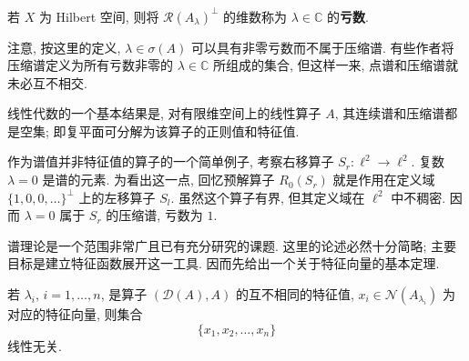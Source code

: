 \begin{Definition}
\label{def:spectral-deficiency}
若 $X$ 为 Hilbert 空间, 则将 $\mathcal{R}(A_\lambda)^\perp$ 的维数称为 $\lambda\in\mathbb{C}$ 的\textbf{亏数}.
\end{Definition}

注意, 按这里的定义, $\lambda\in\sigma(A)$ 可以具有非零亏数而不属于压缩谱. 有些作者将压缩谱定义为所有亏数非零的 $\lambda\in\mathbb{C}$ 所组成的集合, 但这样一来, 点谱和压缩谱就未必互不相交.

\begin{Example}
\label{ex:finite-dimensional-spectrum-regular-eigenvalues}
线性代数的一个基本结果是, 对有限维空间上的线性算子 $A$, 其连续谱和压缩谱都是空集; 即复平面可分解为该算子的正则值和特征值.
\end{Example}

\begin{Example}
\label{ex:right-shift-compression-spectrum}
作为谱值并非特征值的算子的一个简单例子, 考察右移算子 $S_r:\ell^2\to\ell^2$. 复数 $\lambda=0$ 是谱的元素. 为看出这一点, 回忆预解算子 $R_0(S_r)$ 就是作用在定义域 $\{1,0,0,\ldots\}^\perp$ 上的左移算子 $S_l$. 虽然这个算子有界, 但其定义域在 $\ell^2$ 中不稠密. 因而 $\lambda=0$ 属于 $S_r$ 的压缩谱, 亏数为 $1$.
\end{Example}

谱理论是一个范围非常广且已有充分研究的课题. 这里的论述必然十分简略; 主要目标是建立特征函数展开这一工具. 因而先给出一个关于特征向量的基本定理.

\begin{Theorem}
\label{thm:distinct-eigenvalue-eigenvectors-independence}
若 $\lambda_i$, $i=1,\ldots,n$, 是算子 $(\mathcal{D}(A),A)$ 的互不相同的特征值, $x_i\in\mathcal{N}(A_{\lambda_i})$ 为对应的特征向量, 则集合\[\{x_1,x_2,\ldots,x_n\}\]线性无关.
\end{Theorem}

